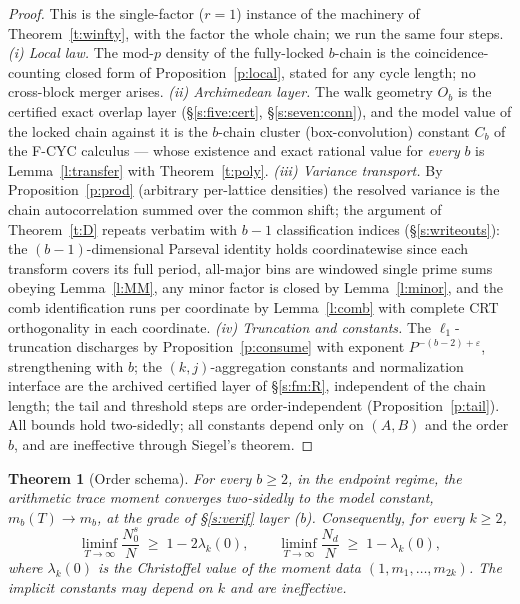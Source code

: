 \documentclass[11pt]{article}
\numberwithin{equation}{section}
\newtheorem{theorem}{Theorem}[section]
\theoremstyle{definition}
\theoremstyle{remark}
\begin{document}
\begin{proof}
This is the single-factor ($r=1$) instance of the machinery
of Theorem~\ref{t:winfty}, with the factor the whole chain;
we run the same four steps. \emph{(i) Local law.} The mod-$p$
density of the fully-locked $b$-chain is the
coincidence-counting closed form of
Proposition~\ref{p:local}, stated for any cycle length; no
cross-block merger arises. \emph{(ii) Archimedean layer.}
The walk geometry $O_b$ is the certified exact overlap layer
(\S\ref{s:five:cert}, \S\ref{s:seven:conn}), and the model
value of the locked chain against it is the $b$-chain
cluster (box-convolution) constant $C_b$ of the F-CYC
calculus --- whose existence and exact rational value for
\emph{every} $b$ is Lemma~\ref{l:transfer} with
Theorem~\ref{t:poly}. \emph{(iii) Variance transport.} By
Proposition~\ref{p:prod} (arbitrary per-lattice densities)
the resolved variance is the chain autocorrelation summed
over the common shift; the argument of Theorem~\ref{t:D}
repeats verbatim with $b-1$ classification indices
(\S\ref{s:writeouts}): the $(b-1)$-dimensional Parseval
identity holds coordinatewise since each transform covers
its full period, all-major bins are windowed single prime
sums obeying Lemma~\ref{l:MM}, any minor factor is closed by
Lemma~\ref{l:minor}, and the comb identification runs per
coordinate by Lemma~\ref{l:comb} with complete CRT
orthogonality in each coordinate. \emph{(iv) Truncation and
constants.} The $\ell_1$-truncation discharges by
Proposition~\ref{p:consume} with exponent
$P^{-(b-2)+\varepsilon}$, strengthening with $b$; the
$(k,j)$-aggregation constants and normalization interface
are the archived certified layer of \S\ref{s:fm:R},
independent of the chain length; the tail and threshold
steps are order-independent (Proposition~\ref{p:tail}). All
bounds hold two-sidedly; all constants depend only on
$(A,B)$ and the order $b$, and are ineffective through
Siegel's theorem.
\end{proof}

\begin{theorem}[Order schema]\label{t:schema}
For every $b\ge2$, in the endpoint regime, the arithmetic
trace moment converges two-sidedly to the model constant,
$m_b(T)\to m_b$, at the grade of \S\ref{s:verif} layer (b).
Consequently, for every $k\ge2$,
\[
\liminf_{T\to\infty}\frac{N_0^{s}}{N}\;\ge\;1-2\lambda_k(0),
\qquad
\liminf_{T\to\infty}\frac{N_d}{N}\;\ge\;1-\lambda_k(0),
\]
where $\lambda_k(0)$ is the Christoffel value of the moment
data $(1,m_1,\dots,m_{2k})$. The implicit constants may
depend on $k$ and are ineffective.
\end{theorem}
\end{document}
